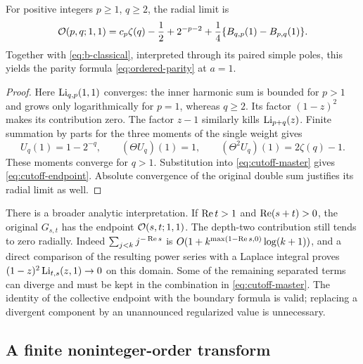 \begin{corollary}\label{cor:cutoff-endpoint}
For positive integers $p\ge1$, $q\ge2$, the radial limit is
\begin{equation}\label{eq:cutoff-endpoint}
 \mathcal O(p,q;1,1)=c_p\zeta(q)-\frac12+2^{-p-2}
 +\frac14\{B_{q,p}(1)-B_{p,q}(1)\}.
\end{equation}
Together with \eqref{eq:b-classical}, interpreted through its paired
simple poles, this yields the parity formula
\eqref{eq:ordered-parity} at $a=1$.
\end{corollary}

\begin{proof}
Here $\operatorname{Li}_{q,p}(1,1)$ converges: the inner harmonic sum is bounded
for $p>1$ and grows only logarithmically for $p=1$, whereas $q\ge2$.
Its factor $(1-z)^2$ makes its contribution zero. The factor
$z-1$ similarly kills $\operatorname{Li}_{p+q}(z)$.
Finite summation by parts for the three moments of the single weight
gives
\[
 U_q(1)=1-2^{-q},\qquad
 (\Theta U_q)(1)=1,\qquad
 (\Theta^2U_q)(1)=2\zeta(q)-1.
\]
These moments converge for $q>1$. Substitution into
\eqref{eq:cutoff-master} gives \eqref{eq:cutoff-endpoint}.
Absolute convergence of the original double sum justifies its radial
limit as well.
\end{proof}

There is a broader analytic interpretation. If $\operatorname{Re} t>1$ and
$\operatorname{Re}(s+t)>0$, the original $G_{s,t}$ has the endpoint
$\mathcal O(s,t;1,1)$. The depth-two contribution still tends to zero
radially. Indeed
$\sum_{j<k}j^{-\operatorname{Re} s}$ is
$O(1+k^{\max(1-\operatorname{Re} s,0)}\log(k+1))$, and a direct comparison of
the resulting power series with a Laplace integral proves
$(1-z)^2\operatorname{Li}_{t,s}(z,1)\to0$ on this domain. Some of the remaining
separated terms can diverge and must be kept in the combination in
\eqref{eq:cutoff-master}. The identity of the collective endpoint
with the boundary formula is valid; replacing a divergent component
by an unannounced regularized value is unnecessary.

\subsection{A finite noninteger-order transform}


